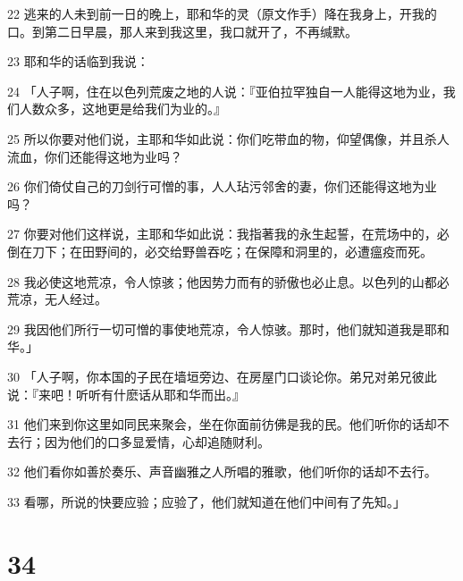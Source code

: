 \par 22 逃来的人未到前一日的晚上，耶和华的灵（原文作手）降在我身上，开我的口。到第二日早晨，那人来到我这里，我口就开了，不再缄默。
\par 23 耶和华的话临到我说：
\par 24 「人子啊，住在以色列荒废之地的人说：『亚伯拉罕独自一人能得这地为业，我们人数众多，这地更是给我们为业的。』
\par 25 所以你要对他们说，主耶和华如此说：你们吃带血的物，仰望偶像，并且杀人流血，你们还能得这地为业吗？
\par 26 你们倚仗自己的刀剑行可憎的事，人人玷污邻舍的妻，你们还能得这地为业吗？
\par 27 你要对他们这样说，主耶和华如此说：我指著我的永生起誓，在荒场中的，必倒在刀下；在田野间的，必交给野兽吞吃；在保障和洞里的，必遭瘟疫而死。
\par 28 我必使这地荒凉，令人惊骇；他因势力而有的骄傲也必止息。以色列的山都必荒凉，无人经过。
\par 29 我因他们所行一切可憎的事使地荒凉，令人惊骇。那时，他们就知道我是耶和华。」
\par 30 「人子啊，你本国的子民在墙垣旁边、在房屋门口谈论你。弟兄对弟兄彼此说：『来吧！听听有什麽话从耶和华而出。』
\par 31 他们来到你这里如同民来聚会，坐在你面前彷佛是我的民。他们听你的话却不去行；因为他们的口多显爱情，心却追随财利。
\par 32 他们看你如善於奏乐、声音幽雅之人所唱的雅歌，他们听你的话却不去行。
\par 33 看哪，所说的快要应验；应验了，他们就知道在他们中间有了先知。」

\chapter{34}

